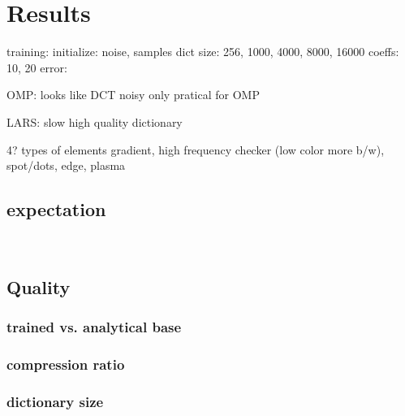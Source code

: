 \chapter{Results}

training:
  initialize: noise, samples 
  dict size: 256, 1000, 4000, 8000, 16000 
  coeffs: 10, 20
  error:

OMP:
  looks like DCT 
  noisy
  only pratical for OMP

LARS:
  slow 
  high quality dictionary
  
  4? types of elements
  gradient, high frequency checker (low color more b/w), spot/dots, edge, plasma

\section{expectation}
\
\section{Quality}
\subsection{trained vs. analytical base}
\subsection{compression ratio}
\subsection{dictionary size}




